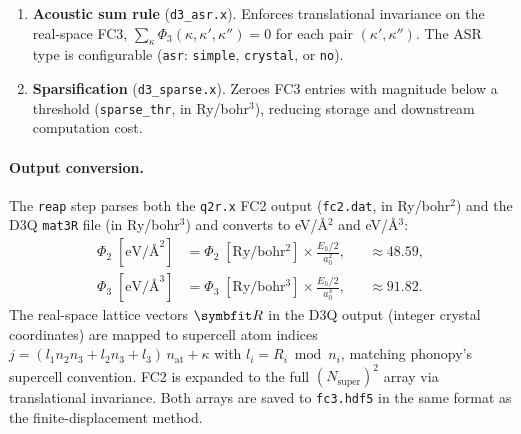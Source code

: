 \begin{enumerate}
  \item \textbf{Acoustic sum rule} (\texttt{d3\_asr.x}).
        Enforces translational invariance on the real-space FC3,
        $\sum_\kappa \Phi_3(\kappa,\kappa',\kappa'') = 0$ for each
        pair $(\kappa',\kappa'')$.  The ASR type is configurable
        (\texttt{asr}: \texttt{simple}, \texttt{crystal}, or
        \texttt{no}).

  \item \textbf{Sparsification} (\texttt{d3\_sparse.x}).
        Zeroes FC3 entries with magnitude below a threshold
        (\texttt{sparse\_thr}, in Ry/bohr$^3$), reducing storage
        and downstream computation cost.
\end{enumerate}

\paragraph{Output conversion.}
The \texttt{reap} step parses both the \texttt{q2r.x} FC2 output
(\texttt{fc2.dat}, in Ry/bohr$^2$) and the D3Q \texttt{mat3R} file (in
Ry/bohr$^3$) and converts to eV/\AA$^2$ and eV/\AA$^3$:
\begin{align}
  \Phi_2\;[\mathrm{eV}/\text{\AA}^2]
    &= \Phi_2\;[\mathrm{Ry/bohr^2}]
       \times \frac{E_h/2}{a_0^2},
    &&\approx 48.59, \label{eq:fc2_conv} \\
  \Phi_3\;[\mathrm{eV}/\text{\AA}^3]
    &= \Phi_3\;[\mathrm{Ry/bohr^3}]
       \times \frac{E_h/2}{a_0^3},
    &&\approx 91.82. \label{eq:fc3_conv}
\end{align}
The real-space lattice vectors $\vc{R}$ in the D3Q output (integer
crystal coordinates) are mapped to supercell atom indices
$j = (l_1 n_2 n_3 + l_2 n_3 + l_3)\, n_\text{at} + \kappa$ with
$l_i = R_i \bmod n_i$, matching phonopy's supercell convention.  FC2
is expanded to the full $(N_\text{super})^2$ array via translational
invariance.  Both arrays are saved to \texttt{fc3.hdf5} in the same
format as the finite-displacement method.

